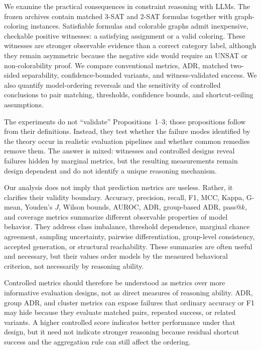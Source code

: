 \documentclass[acmsmall,screen,review,anonymous]{acmart}
\newcounter{experiment}
\begin{document}
We examine the practical consequences in constraint reasoning with
LLMs. The frozen archives contain matched 3-SAT and 2-SAT formulas together
with graph-coloring instances. Satisfiable formulas and colorable graphs
admit inexpensive, checkable positive witnesses: a satisfying assignment or
a valid coloring. These witnesses are stronger observable evidence than a
correct category label, although they remain asymmetric because the negative
side would require an UNSAT or non-colorability proof. We compare
conventional metrics, ADR, matched two-sided separability, confidence-bounded
variants, and witness-validated success. We also quantify model-ordering
reversals and the sensitivity of controlled conclusions to pair matching,
thresholds, confidence bounds, and shortcut-ceiling assumptions.

The experiments do not ``validate'' Propositions~1--3; those propositions
follow from their definitions. Instead, they test whether the failure modes
identified by the theory occur in realistic evaluation pipelines and whether
common remedies remove them. The answer is mixed: witnesses and controlled
designs reveal failures hidden by marginal metrics, but the resulting
measurements remain design dependent and do not identify a unique reasoning
mechanism.

Our analysis does not imply that prediction metrics are useless. Rather, it
clarifies their validity boundary. Accuracy, precision, recall, F1, MCC,
Kappa, G-mean, Youden's \(J\), Wilson bounds, AUROC, ADR, group-based ADR,
pass@\(k\), and coverage metrics summarize different observable properties of
model behavior. They address class imbalance, threshold dependence, marginal
chance agreement, sampling uncertainty, pairwise differentiation,
group-level consistency, accepted generation, or structural reachability.
These summaries are often useful and necessary, but their values order
models by the measured behavioral criterion, not necessarily by reasoning
ability.

Controlled metrics should therefore be understood as metrics over more
informative evaluation designs, not as direct measures of reasoning ability.
ADR, group ADR, and cluster metrics can expose failures that ordinary
accuracy or F1 may hide because they evaluate matched pairs, repeated
success, or related variants. A higher controlled score indicates better
performance under that design, but it need not indicate stronger reasoning
because residual shortcut success and the aggregation rule can still affect
the ordering.
\end{document}
